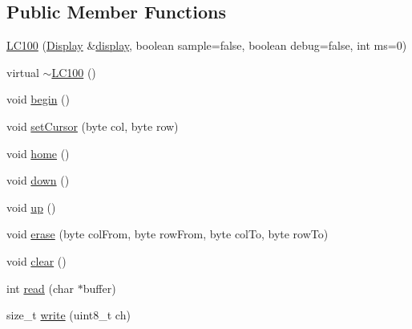 \subsection*{Public Member Functions}
\begin{DoxyCompactItemize}
\item 
\hyperlink{classcom_1_1diag_1_1amigo_1_1LC100_a731566b8debd903b62c873851641534f}{LC100} (\hyperlink{structcom_1_1diag_1_1amigo_1_1Display}{Display} \&\hyperlink{TinyTerminal_8ino_aa69ecd18e38aaa6c48d94adc9f91f0ef}{display}, boolean sample=false, boolean debug=false, int ms=0)
\item 
\hypertarget{classcom_1_1diag_1_1amigo_1_1LC100_adf882a468cb6b06439927ed426929396}{
virtual \hyperlink{classcom_1_1diag_1_1amigo_1_1LC100_adf882a468cb6b06439927ed426929396}{$\sim$LC100} ()}
\label{classcom_1_1diag_1_1amigo_1_1LC100_adf882a468cb6b06439927ed426929396}

\item 
void \hyperlink{classcom_1_1diag_1_1amigo_1_1LC100Base_a3cf988ae645ac743c6b5cafa2748e30b}{begin} ()
\item 
void \hyperlink{classcom_1_1diag_1_1amigo_1_1LC100Base_aadfb19a306738b52afb990734a412b94}{setCursor} (byte col, byte row)
\item 
\hypertarget{classcom_1_1diag_1_1amigo_1_1LC100Base_aaa8a0afa8ba3d93bc7230f42d794c620}{
void \hyperlink{classcom_1_1diag_1_1amigo_1_1LC100Base_aaa8a0afa8ba3d93bc7230f42d794c620}{home} ()}
\label{classcom_1_1diag_1_1amigo_1_1LC100Base_aaa8a0afa8ba3d93bc7230f42d794c620}

\item 
void \hyperlink{classcom_1_1diag_1_1amigo_1_1LC100Base_af532b82f424d25c8a7b014f16a463abb}{down} ()
\item 
void \hyperlink{classcom_1_1diag_1_1amigo_1_1LC100Base_a836be0f28470396a23a3c28ef835c33d}{up} ()
\item 
void \hyperlink{classcom_1_1diag_1_1amigo_1_1LC100Base_a4a92d06a7c79b66d6fa47581c727f688}{erase} (byte colFrom, byte rowFrom, byte colTo, byte rowTo)
\item 
\hypertarget{classcom_1_1diag_1_1amigo_1_1LC100Base_a91d4bc06663d0d6d9c0e550e3175a55b}{
void \hyperlink{classcom_1_1diag_1_1amigo_1_1LC100Base_a91d4bc06663d0d6d9c0e550e3175a55b}{clear} ()}
\label{classcom_1_1diag_1_1amigo_1_1LC100Base_a91d4bc06663d0d6d9c0e550e3175a55b}

\item 
int \hyperlink{classcom_1_1diag_1_1amigo_1_1LC100Base_a2bbb2cc266ee6a1b9194f12c1ce9c1bf}{read} (char $\ast$buffer)
\item 
size\_\-t \hyperlink{classcom_1_1diag_1_1amigo_1_1LC100Base_aa65643803194c15f83e0204d3523ec7e}{write} (uint8\_\-t ch)
\end{DoxyCompactItemize}
